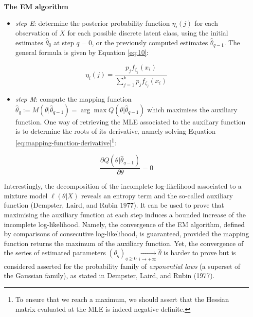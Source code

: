 \begin{blackbox}{\textbf{The EM algorithm}}

\begin{center}

\begin{itemize}
\tightlist
\item
  \emph{step E}: determine the posterior probability function \(\eta_i(j)\)
  for each observation of \(X\) for each possible discrete latent class,
  using the initial estimates \(\hat{\theta}_0\) at step \(q=0\), or the
  previously computed estimates \(\hat{\theta}_{q-1}\). The general formula is given by Equation \eqref{eq:10}:
\end{itemize}

\begin{equation}
    \eta_i(j) = \frac{p_j f_{\zeta_j} (x_i)}{\sum_{j=1}^k p_j f_{\zeta_j} (x_i)}
\label{eq:10}
\end{equation}

\begin{itemize}
\tightlist
\item
  \emph{step M}: compute the mapping function
  \(\hat{\theta}_q:=M(\theta | \hat{\theta}_{q-1})=\arg \max Q(\theta| \hat{\theta}_{q-1})\) which maximises the auxiliary function. One way of retrieving the MLE associated to the auxiliary function is to determine the roots of its derivative, namely solving Equation \eqref{eq:mapping-function-derivative}\footnote{To ensure
    that we reach a maximum, we should assert that the Hessian matrix evaluated at the MLE is indeed negative definite.}:
\end{itemize}

\begin{equation}
    \frac{\partial Q(\theta| \hat{\theta}_{q-1})}{\partial \theta}=0
\label{eq:mapping-function-derivative}
\end{equation}

\end{center}

\end{blackbox}

Interestingly, the decomposition of the incomplete log-likelihood
associated to a mixture model \(\ell(\theta|X)\) reveals an entropy term
and the so-called auxiliary function (Dempster, Laird, and Rubin 1977). It can be used to prove that
maximising the auxiliary function at each step induces a bounded
increase of the incomplete log-likelihood. Namely, the convergence of
the EM algorithm, defined by comparisons of consecutive log-likelihood,
is guaranteed, provided the mapping function returns the maximum of the
auxiliary function. Yet, the convergence of the series of estimated
parameters
\((\theta_q)_{q \ge 0} \underset{i\to +\infty}{\longrightarrow} \hat{\theta}\)
is harder to prove but is considered asserted for the probability family
of \emph{exponential laws} (a superset of the Gaussian family), as stated in
Dempster, Laird, and Rubin (1977).

